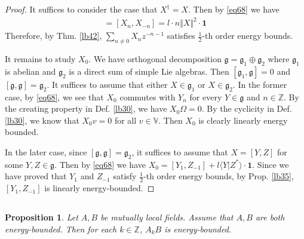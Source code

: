 \documentclass[12pt,b5paper,notitlepage]{article}
\theoremstyle{definition}
\theoremstyle{plain}
\newtheorem{pp}[df]{Proposition}
\newcommand{\idt}{\mathbf{1}}
\newcommand{\bk}[1]{\langle {#1}\rangle}
\newcommand{\gk}{\mathfrak g}
\newcommand{\Vbb}{\mathbb V}
\newcommand{\Zbb}{\mathbb Z}
\numberwithin{equation}{section}
\begin{document}
\begin{proof}
It suffices to consider the case that $X^\dagger=X$. Then by \eqref{eq68} we have
\begin{align*}
[X_n,X_n^\dagger]=[X_n,X_{-n}]=l\cdot n \Vert X\Vert^2\cdot \idt
\end{align*}
Therefore, by Thm. \ref{lb42}, $\sum_{n\neq 0}X_nz^{-n-1}$ satisfies $\frac 12$-th order energy bounds. 

It remains to study $X_0$. We have orthogonal decomposition $\gk=\gk_1\oplus\gk_2$ where $\gk_1$ is abelian and $\gk_2$ is a direct sum of simple Lie algebras. Then $[\gk_1,\gk]=0$ and $[\gk,\gk]=\gk_2$. It suffices to assume that either $X\in \gk_1$ or $X\in\gk_2$. In the former case, by \eqref{eq68}, we see that $X_0$ commutes with $Y_n$ for every $Y\in\gk$ and $n\in\Zbb$. By the creating property in Def. \ref{lb30}, we have $X_0\Omega=0$. By the cyclicity in Def. \ref{lb30}, we know that $X_0v=0$ for all $v\in\Vbb$. Then $X_0$ is clearly linearly energy bounded.

In the later case, since $[\gk,\gk]=\gk_2$, it suffices to assume that $X=[Y,Z]$ for some $Y,Z\in\gk$. Then by \eqref{eq68} we have $X_0=[Y_1,Z_{-1}]+l\bk{Y|Z^*}\cdot\idt$. Since we have proved that $Y_1$ and $Z_{-1}$ satisfy $\frac 12$-th order energy bounds, by Prop. \ref{lb35}, $[Y_1,Z_{-1}]$ is linearly energy-bounded.
\end{proof}



\subsection{}

\begin{pp}\label{lb105}
Let $A,B$ be mutually local fields. Assume that $A,B$ are both energy-bounded. Then for each $k\in\Zbb$, $A_kB$ is energy-bounded.
\end{pp}
\end{document}

